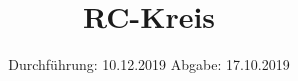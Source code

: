 

\subject{353 }
\title{RC-Kreis}
\date{%
  Durchführung: 10.12.2019
  \hspace{3em}
  Abgabe: 17.10.2019
}


\nocite{V353}
\maketitle
\thispagestyle{empty}
\tableofcontents
\newpage







\printbibliography{}


